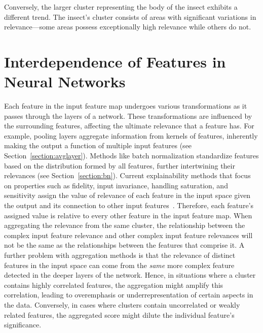 Conversely, the larger cluster representing the body of the insect exhibits a different trend. The insect's cluster consists of areas with significant variations in relevance—some areas possess exceptionally high relevance while others do not. 


\section{Interdependence of Features in Neural Networks}

Each feature in the input feature map undergoes various transformations as it passes through the layers of a network. These transformations are influenced by the surrounding features, affecting the ultimate relevance that a feature has. For example, pooling layers aggregate information from kernels of features, inherently making the output a function of multiple input features (see Section~\ref{section:avglayer}). Methods like batch normalization standardize features based on the distribution formed by all features, further intertwining their relevances (see Section~\ref{section:bn}). Current explainability methods that focus on properties such as fidelity, input invariance, handling saturation, and sensitivity assign the value of relevance of each feature in the input space given the output and its connection to other input features~\cite{SimonyanVZ13, SpringenbergDBR14, bach2015pixel, SelvarajuCDVPB20, ChattopadhyaySH18, abs-1908-01224, SmilkovTKVW17}. Therefore, each feature's assigned value is relative to every other feature in the input feature map. When aggregating the relevance from the same cluster, the relationship between the complex input feature relevance and other complex input feature relevances will not be the same as the relationships between the features that comprise it. A further problem with aggregation methods is that the relevance of distinct features in the input space can come from the \emph{same} more complex feature detected in the deeper layers of the network. Hence, in situations where a cluster contains highly correlated features, the aggregation might amplify this correlation, leading to overemphasis or underrepresentation of certain aspects in the data. Conversely, in cases where clusters contain uncorrelated or weakly related features, the aggregated score might dilute the individual feature's significance.

